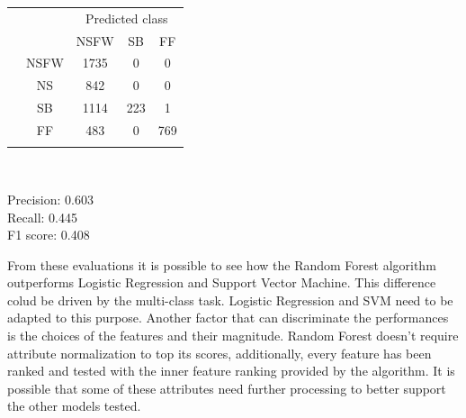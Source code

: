 \begin{itemize}
	{
		\centering
		\begin{tabular}{@{}cc|ccc@{}}
			\multicolumn{1}{c}{} &\multicolumn{1}{c}{} &\multicolumn{3}{c}{Predicted class} \\ 
			\multicolumn{1}{c}{} & 
			\multicolumn{1}{c|}{} & 
			\multicolumn{1}{c}{NSFW} & 
			\multicolumn{1}{c}{SB} & 
			\multicolumn{1}{c}{FF} \\
			\cline{2-5}
			\multirow[c]{3}{*}{\rotatebox[origin=tr]{90}{Actual class}}
			& NSFW  & 1735 & 0 & 0\\
			& NS  & 842 & 0 & 0\\
			& SB  & 1114 & 223 & 1\\
			& FF  & 483 & 0 & 769\\
			\cline{2-5}\\
		\end{tabular}\\
	}
	
	Precision: 0.603\\
	Recall: 0.445\\
	F1 score: 0.408
	
\end{itemize}

From these evaluations it is possible to see how the Random Forest algorithm outperforms Logistic Regression and Support Vector Machine. This difference colud be driven by the multi-class task. Logistic Regression and SVM need to be adapted to this purpose. Another factor that can discriminate the performances is the choices of the features and their magnitude. Random Forest doesn't require attribute normalization to top its scores, additionally, every feature has been ranked and tested with the inner feature ranking provided by the algorithm. It is possible that some of these attributes need further processing to better support the other models tested.


